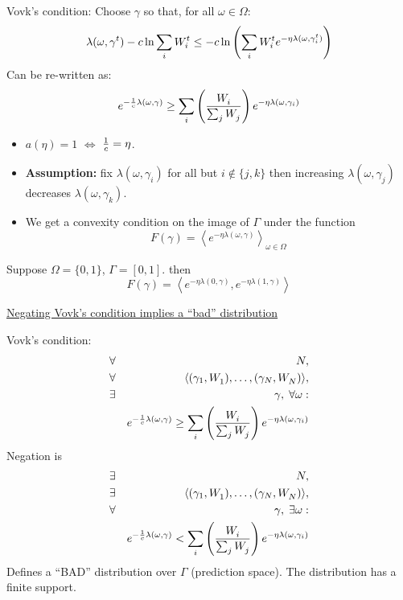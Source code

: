 \begin{flushleft}
\begin{LARGE}
Vovk's condition:
Choose $\gamma$ so that, for all $\omega \in \Omega$:
\[
\lambda(\omega,\gamma^t) - c \ln \sum_i W_{i}^{t} 
\leq
- c \ln \left( \sum_i 
      W_{i}^{t}e^{-\eta \lambda(\omega,\gamma_i^t)}
        \right)
\]
Can be re-written as:
\[
e^{-{1 \over c} \lambda(\omega,\gamma)}
\geq
\sum_i 
\left({W_{i}^{} \over \sum_j W_{j}^{}}\right)
e^{-\eta \lambda(\omega,\gamma_i)}
\]
\begin{itemize}
\item
$a(\eta)=1$ $\Leftrightarrow$ ${1 \over c} = \eta$.
\item
{\bf Assumption:}
fix $\lambda(\omega,\gamma_i)$ for all but $i \not\in \{j,k\}$
then increasing $\lambda(\omega,\gamma_j)$ decreases
$\lambda(\omega,\gamma_k)$. 
\item
We get a convexity condition on the image of $\Gamma$ under the
function
\[F(\gamma) = 
\left\langle 
   e^{-\eta \lambda(\omega,\gamma)} 
\right\rangle_{\omega \in \Omega}
\]
\end{itemize}

 Suppose $\Omega=\{0,1\}$, $\Gamma = [0,1]$.
then
\[
F(\gamma) = \left\langle
  e^{-\eta \lambda(0,\gamma)},e^{-\eta \lambda(1,\gamma)}
\right\rangle
\]

\pagebreak

\begin{center}
\underline{Negating Vovk's condition implies a ``bad'' distribution}
\end{center}
Vovk's condition:
\begin{eqnarray*}
& \forall & N,\\
& \forall & \langle (\gamma_1,W_{1}^{}),\ldots,(\gamma_N,W_{N}^{}) \rangle,\\
& \exists & \gamma,\; \forall \omega: \\
&&e^{-{1 \over c} \lambda(\omega,\gamma)}
\geq
\sum_i 
\left({W_{i}^{} \over \sum_j W_{j}^{}}\right)
e^{-\eta \lambda(\omega,\gamma_i)}
\end{eqnarray*}
Negation is
\begin{eqnarray*}
& \exists & N,\\ 
& \exists &
\langle (\gamma_1,W_{1}^{}),\ldots,(\gamma_N,W_{N}^{}) \rangle,\\
& \forall & \gamma,\; \exists \omega: \\
&& e^{-{1 \over c} \lambda(\omega,\gamma)}
<
\sum_i 
\left({W_{i}^{} \over \sum_j W_{j}^{}}\right)
e^{-\eta \lambda(\omega,\gamma_i)}
\end{eqnarray*}
Defines a ``BAD'' distribution over $\Gamma$ (prediction space).\newline
The distribution has a finite support.


\end{LARGE}
\end{flushleft}
